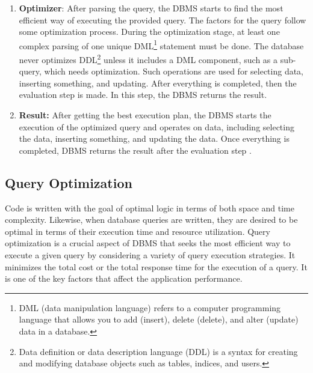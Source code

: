 \begin{enumerate}
\begin{enumerate}
    \end{enumerate}
    
    
    \item \textbf{Optimizer}: After parsing the query, the DBMS starts to find the most efficient way of executing the provided query. The factors for the query follow some optimization process. During the optimization stage, at least one complex parsing of one unique DML\footnote{DML  (data manipulation language) refers to a computer programming language that allows you to add (insert), delete (delete), and alter (update) data in a database.} statement must be done. The database never optimizes DDL\footnote{Data definition or data description language (DDL) is a syntax for creating and modifying database objects such as tables, indices, and users.} unless it includes a DML component, such as a sub-query, which needs optimization. Such operations are used for selecting data, inserting something, and updating. After everything is completed, then the evaluation step is made. In this step, the DBMS returns the result.
    
    \item \textbf{Result:} After getting the best execution plan, the DBMS starts the execution of the optimized query and operates on data, including selecting the data, inserting something, and updating the data. Once everything is completed, DBMS returns the result after the evaluation step \cite{Query,QueryProcessing,Oracle}.
    
\end{enumerate}

\subsection{Query Optimization } Code is written with the goal of optimal logic in terms of both space and time complexity. Likewise, when database queries are written, they are desired to be optimal in terms of their execution time and resource utilization. Query optimization is a crucial aspect of DBMS that seeks the most efficient way to execute a given query by considering a variety of query execution strategies. It minimizes the total cost or the total response time for the execution of a query. It is one of the key factors that affect the application performance.\vspace{.4cm}

